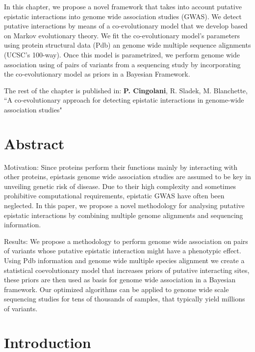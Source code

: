 In this chapter, we propose a novel framework that takes into account putative epistatic interactions into genome wide association studies (GWAS). We detect putative interactions by means of a co-evolutionary model that we develop based on Markov evolutionary theory. We fit the co-evolutionary model's parameters using protein structural data (Pdb) an genome wide multiple sequence alignments (UCSC's 100-way). Once this model is parametrized, we perform genome wide association using of pairs of variants  from a sequencing study by incorporating the co-evolutionary model as priors in a Bayesian Framework.

The rest of the chapter is published in: \textbf{P. Cingolani}, R. Sladek, M. Blanchette, ``A co-evolutionary approach for detecting epistatic interactions in genome-wide association studies"

\section{Abstract}

Motivation: Since proteins perform their functions mainly by interacting with other proteins, epistasis genome wide association studies are assumed to be key in unveiling genetic risk of disease. Due to their high complexity and sometimes prohibitive computational requirements, epistatic GWAS have often been neglected. In this paper, we propose a novel methodology for analysing putative epistatic interactions by combining multiple genome alignments and sequencing information. 

Results: We propose a methodology to perform genome wide association on pairs of variants whose putative epistatic interaction might have a phenotypic effect. Using Pdb information and genome wide multiple species alignment we create a statistical coevolutionary model that increases priors of putative interacting sites, these priors are then used as basis for genome wide association in a Bayesian framework. Our optimized algorithms can be applied to genome wide scale sequencing studies for tens of thousands of samples, that typically yield millions of variants.

\section{Introduction}

